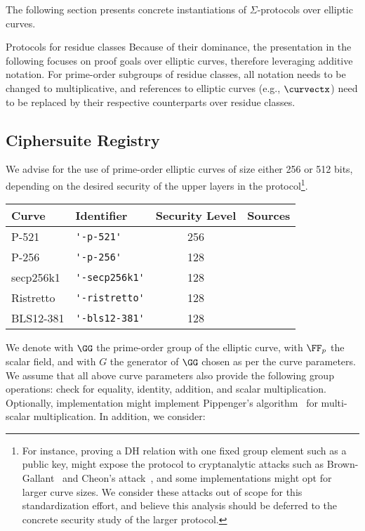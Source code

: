 \documentclass[11pt]{article}
\begin{document}
The following section presents concrete instantiations of $\Sigma$-protocols over elliptic curves.

\begin{remark}{Protocols for residue classes}{}
  Because of their dominance, the presentation in the following focuses on proof goals over elliptic curves, therefore leveraging additive notation.
	For prime-order subgroups of residue classes, all notation needs to be changed to multiplicative, and references to elliptic curves (e.g., $\curvectx$) need to be replaced by their respective counterparts over residue classes.
\end{remark}

\subsection{Ciphersuite Registry}
 We advise for the use of prime-order elliptic curves of size either 256 or 512 bits, depending on the desired security of the upper layers in the protocol\footnote{For instance, proving a DH relation with one fixed group element such as a public key, might expose the protocol to cryptanalytic attacks such as Brown-Gallant~\cite{EPRINT:BroGal04} and Cheon's attack~\cite{EC:Cheon06}, and some implementations might opt for larger curve sizes. We consider these attacks out of scope for this standardization effort, and believe this analysis should be deferred to the concrete security study of the larger protocol.}.

 \vspace{1em}
 \begin{center}
 \begin{tabular}{llcc}
  \hline
  Curve  & Identifier &  Security Level & Sources \\
  \hline
 P-521 & \verb|'-p-521'|     & 256& \cite{fips2} \\
 P-256 & \verb|'-p-256'|     & 128 & \cite{fips2}  \\
 secp256k1 & \verb|'-secp256k1'| & 128 & \cite{SECG} \\
 Ristretto & \verb|'-ristretto'| & 128 & \cite{cfrg-ristretto-decaf} \\
 BLS12-381 & \verb|'-bls12-381'| & 128 & \cite{bls12} \\
 \end{tabular}
\end{center}
We denote with $\GG$ the prime-order group of the elliptic curve, with $\FF_p$ the scalar field, and with $G$ the generator of $\GG$ chosen as per the curve parameters.
We assume that all above curve parameters also provide the following group operations: check for equality, identity, addition, and scalar multiplication. Optionally, implementation might implement Pippenger's algorithm~\cite{pippenger} for multi-scalar multiplication. In addition, we consider:
\end{document}
